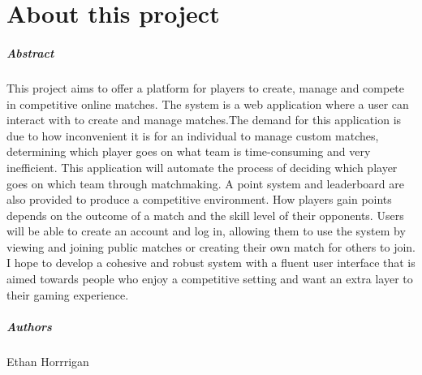 
\chapter*{About this project}
\paragraph{Abstract}

This project aims to offer a platform for players to create, manage and compete in competitive online matches. The system is a web application where a user can interact with to create and manage matches.\newline The demand for this application is due to how inconvenient it is for an individual to manage custom matches, determining which player goes on what team is time-consuming and very inefficient. This application will automate the process of deciding which player goes on which team through matchmaking. A point system and leaderboard are also provided to produce a competitive environment. How players gain points depends on the outcome of a match and the skill level of their opponents. Users will be able to create an account and log in, allowing them to use the system by viewing and joining public matches or creating their own match for others to join. I hope to develop a cohesive and robust system with a fluent user interface that is aimed towards people who enjoy a competitive setting and want an extra layer to their gaming experience.
\paragraph{Authors}
Ethan Horrrigan



